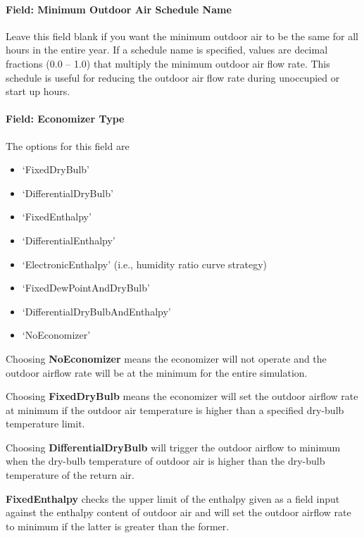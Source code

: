\paragraph{Field: Minimum Outdoor Air Schedule Name}\label{field-minimum-outdoor-air-schedule-name-1}

Leave this field blank if you want the minimum outdoor air to be the same for all hours in the entire year. If a schedule name is specified, values are decimal fractions (0.0 -- 1.0) that multiply the minimum outdoor air flow rate. This schedule is useful for reducing the outdoor air flow rate during unoccupied or start up hours.

\paragraph{Field: Economizer Type}\label{field-economizer-type-1}

The options for this field are

\begin{itemize}
\item
  `FixedDryBulb'
\item
  `DifferentialDryBulb'
\item
  `FixedEnthalpy'
\item
  `DifferentialEnthalpy'
\item
  `ElectronicEnthalpy' (i.e., humidity ratio curve strategy)
\item
  `FixedDewPointAndDryBulb'
\item
  `DifferentialDryBulbAndEnthalpy'
\item
  `NoEconomizer'
\end{itemize}

Choosing \textbf{NoEconomizer} means the economizer will not operate and the outdoor airflow rate will be at the minimum for the entire simulation.

Choosing \textbf{FixedDryBulb} means the economizer will set the outdoor airflow rate at minimum if the outdoor air temperature is higher than a specified dry-bulb temperature limit.

Choosing \textbf{DifferentialDryBulb} will trigger the outdoor airflow to minimum when the dry-bulb temperature of outdoor air is higher than the dry-bulb temperature of the return air.

\textbf{FixedEnthalpy} checks the upper limit of the enthalpy given as a field input against the enthalpy content of outdoor air and will set the outdoor airflow rate to minimum if the latter is greater than the former.


